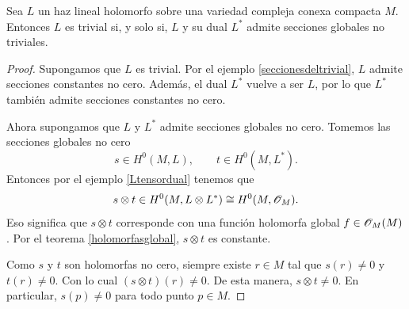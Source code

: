 	\begin{lemma}\label{seccionesnotriviales}
		Sea $L$ un haz lineal holomorfo sobre una variedad compleja conexa compacta $M$. Entonces $L$ es trivial si, y solo si, $L$ y su dual $L^*$ admite secciones globales no triviales.  
	\end{lemma}
	\begin{proof}
		Supongamos que $L$ es trivial. Por el ejemplo \ref{seccionesdeltrivial}, $L$ admite secciones constantes no cero. Además, el dual $L^*$ vuelve a ser $L$, por lo que $L^*$ también admite secciones constantes no cero.
		
		Ahora supongamos que $L$ y $L^*$ admite secciones globales no cero. Tomemos las secciones globales no cero
		\begin{equation*}
			s\in H^0(M,L),
			\qquad
			t\in H^0(M,L^*).
		\end{equation*}
		Entonces por el ejemplo \ref{Ltensordual} tenemos que
		\begin{equation*}
			s\otimes t\in H^0(M,L\otimes L^*)\cong H^0(M,\mathscr{O}_M).
		\end{equation*}
		Eso significa que $s\otimes t$ corresponde con una función holomorfa global $f\in \mathscr{O}_M(M)$. Por el teorema \ref{holomorfasglobal}, $s\otimes t$ es constante. 
		
		Como $s$ y $t$ son holomorfas no cero, siempre existe $r\in M$ tal que $s(r)\neq 0$ y $t(r)\neq 0$. Con lo cual $(s\otimes t)(r)\neq 0$. De esta manera, $s\otimes t\neq 0$. En particular, $s(p)\neq 0$ para todo punto $p\in M$.
		

\end{proof}
